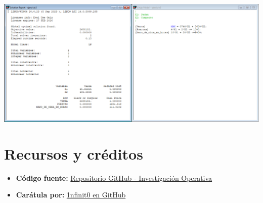 \documentclass[12pt]{article}
\begin{document}
\begin{center}
  \includegraphics[width=1\textwidth]{./assets/ejercicio3.PNG}
\end{center}

\newpage
\section*{Recursos y créditos}

\begin{itemize}
    \item \textbf{Código fuente:} \href{https://github.com/MateoTVara/C08-InvestigacionOperativa}{Repositorio GitHub - Investigación Operativa}
    \item \textbf{Carátula por:} \href{https://github.com/1nfinit0}{1nfinit0 en GitHub}
\end{itemize}
\end{document}
